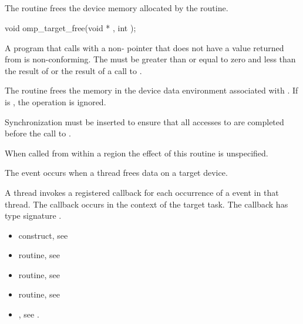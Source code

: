 \subsection{}
\label{subsec:omp_target_free}
\summary
The  routine frees the device memory allocated by the  routine.

\format
\begin{boxedcode}
void omp\_target\_free(void * , int );
\end{boxedcode}

\constraints

A program that calls  with a non- pointer 
that does not have a value returned from  is
non-conforming.  The  must be greater than or equal to 
zero and less than the result of  or the
 result of a call to .

\pagebreak
{}
\effect

The  routine frees the memory in the device data
environment associated with .  If  is
, the operation is ignored.

Synchronization must be inserted to ensure that all accesses to 
 are completed before the call to .

When called from within a  region the effect of this routine
is unspecified.

\events
The  event occurs when a thread frees data on a target device.

\tools

A thread invokes a registered 
callback for each occurrence of a  event in that thread. 
The callback occurs in the context of the target task.  The callback has type signature
. 


\crossreferences
\begin{itemize}
\item {} construct, see 

\item {} routine, see 

\item {} routine, see 

\item {} routine, see 

\item {}, see 
.

\end{itemize}



